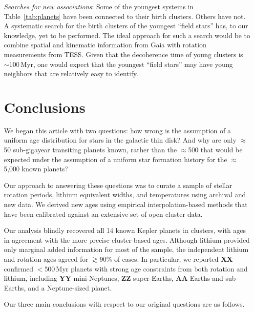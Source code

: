 \documentclass[11pt,twocolumn,tighten]{aastex63}
\begin{document}
{\it Searches for new associations}:
Some of the youngest systems in Table~\ref{tab:planets} have been
connected to their birth clusters.
Others have not.
A systematic search for the birth clusters of the youngest ``field stars'' has, to our knowledge,
yet to be performed.
The ideal approach for such a search would be to combine spatial and kinematic information
from Gaia with rotation measurements from TESS.
Given that the decoherence time of young clusters is $\sim$100\,Myr, one would expect that
the youngest ``field stars'' may have young neighbors that are relatively easy to
identify.




\section{Conclusions}
\label{sec:conclusions}

We began this article with two questions: how wrong is the
assumption of a uniform age distribution for stars in the galactic
thin disk?  And why are only $\approx$50 sub-gigayear transiting
planets known, rather than the $\approx$500 that would be expected
under the assumption of a uniform star formation history for the
$\approx$5{,}000 known planets?

Our approach to answering these questions was to curate a sample of
stellar rotation periods, lithium equivalent widths, and temperatures
using archival and new data.  We derived new ages
using empirical interpolation-based methods that have been
calibrated against an extensive set of open cluster data.

Our analysis blindly recovered all 14 known Kepler planets in
clusters, with ages in agreement with the more precise cluster-based
ages.  Although lithium provided only marginal added information for
most of the sample, the independent lithium and rotation ages agreed
for $\gtrsim$90\% of cases.  
In particular, we reported {\bf XX} confirmed
$<$500\,Myr planets with strong age constraints from both rotation and
lithium, including {\bf YY} mini-Neptunes, {\bf ZZ} super-Earths, {\bf
AA} Earths and sub-Earths, and a Neptune-sized planet.

Our three main conclusions with respect to our original questions are
as follows.
\end{document}
